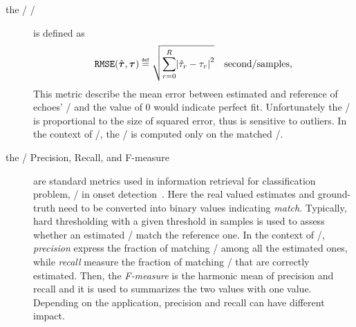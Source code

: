 \begin{description}
    \item[the \TOAs/ \RMSEtxt/] is defined as
    \begin{equation}
        \RMSE(\hat{\boldsymbol{\tau}}, \boldsymbol{\tau}) \eqdef \sqrt{\sum_{\idxEch=0}^{\numEchs} \abs{\hat{\tau}_\idxEch - \tau_\idxEch}^2} \quad \text{second/samples}
        ,
    \end{equation}
    This metric describe the mean error between estimated and reference of echoes' \TOAs/ and the value of $0$ would indicate perfect fit.
    Unfortunately the \RMSEtxt/ is proportional to the size of squared error, thus is sensitive to outliers.
    In the context of \AER/, the \RMSEtxt/ is computed only on the matched \TOAs/.

    \item[the \TOAs/ Precision, Recall, and F-measure] are standard metrics used in information retrieval for classification problem, \eg/ in onset detection~.
    Here the real valued estimates and ground-truth need to be converted into binary values indicating \textit{match}.
    Typically, hard thresholding with a given threshold in samples is used to assess whether an estimated \TOAs/ match the reference one.
    In the context of \AER/, \textit{precision} express the fraction of matching \TOAs/ among all the estimated ones, while \textit{recall} measure the fraction of matching \TOAs/ that are correctly estimated.
    Then, the \textit{F-measure} is the harmonic mean of precision and recall and it is used to summarizes the two values with one value.
    Depending on the application, precision and recall can have different impact.

\end{description}
